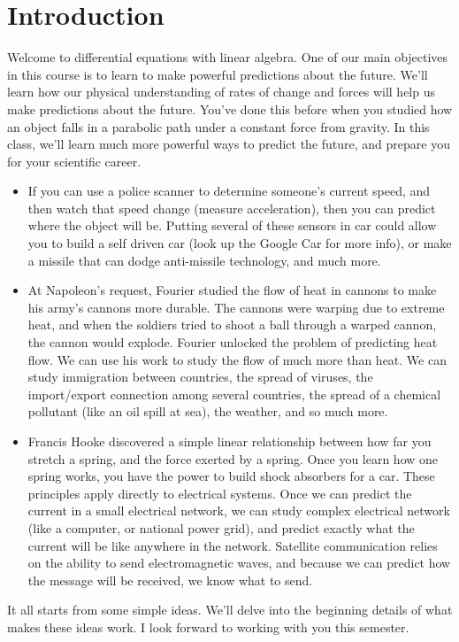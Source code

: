 \documentclass[letterpaper,oneside]{book}%
\theoremstyle{plain}
\theoremstyle{box}
\theoremstyle{problem}
\begin{document}
\chapter{Introduction}
Welcome to differential equations with linear algebra. 
One of our main objectives in this course is to learn to make powerful predictions about the future. We'll learn how our physical understanding of rates of change and forces will help us make predictions about the future.  
You've done this before when you studied how an object falls in a parabolic path under a constant force from gravity.  
In this class, we'll learn much more powerful ways to predict the future, and prepare you for your scientific career. 
\begin{itemize}
 \item If you can use a police scanner to determine someone's current speed, and then watch that speed change (measure acceleration), then you can predict where the object will be. Putting several of these sensors in car could allow you to build a self driven car (look up the Google Car for more info), or make a missile that can dodge anti-missile technology, and much more. 
 \item At Napoleon's request, Fourier studied the flow of heat in cannons to make his army's cannons more durable. The cannons were warping due to extreme heat, and when the soldiers tried to shoot a ball through a warped cannon, the cannon would explode.  Fourier unlocked the problem of predicting heat flow. We can use his work to study the flow of much more than heat. We can study immigration between countries, the spread of viruses, the import/export connection among several countries, the spread of a chemical pollutant (like an oil spill at sea), the weather, and so much more.
 \item Francis Hooke discovered a simple linear relationship between how far you stretch a spring, and the force exerted by a spring.  Once you learn how one spring works, you have the power to build shock absorbers for a car. These principles apply directly to electrical systems. Once we can predict the current in a small electrical network, we can study complex electrical network (like a computer, or national power grid), and predict exactly what the current will be like anywhere in the network. Satellite communication relies on the ability to send electromagnetic waves, and because we can predict how the message will be received, we know what to send. 
\end{itemize}
 It all starts from some simple ideas.  We'll delve into the beginning details of what makes these ideas work.  I look forward to working with you this semester.
\end{document}
